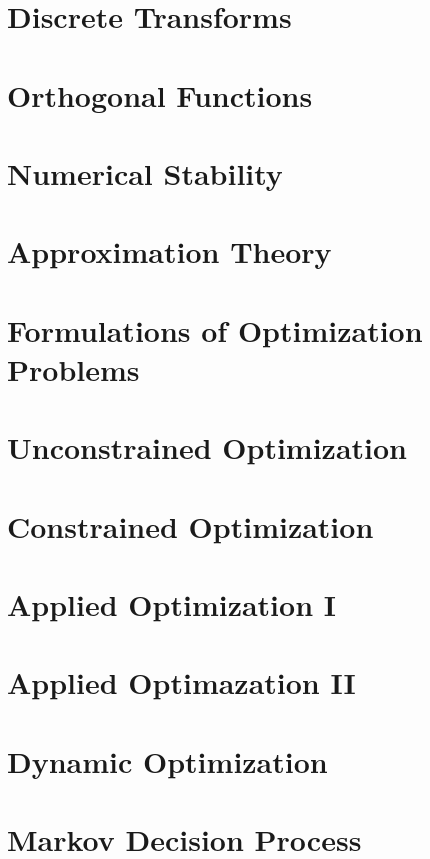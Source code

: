 \documentclass{newsiambook}
\begin{document}
\part{Discrete Transforms}

\part{Orthogonal Functions}

\part{Numerical Stability}

\part{Approximation Theory}

\part{Formulations of Optimization Problems}

\part{Unconstrained Optimization}

\part{Constrained Optimization}

\part{Applied Optimization I}

\part{Applied Optimazation II}

\part{Dynamic Optimization}

\part{Markov Decision Process}
\end{document}
